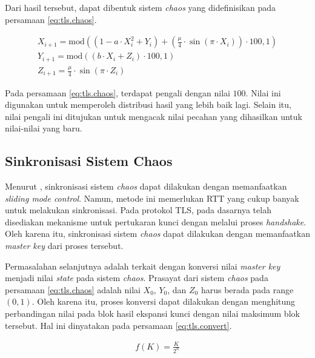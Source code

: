 Dari hasil tersebut, dapat dibentuk sistem \emph{chaos} yang didefinisikan pada persamaan \ref{eq:tls.chaos}.

\begin{equation}
  \begin{aligned}
    X_{i+1} = \text{mod}((1 - a \cdot X_i^2 + Y_i) + (\frac{\mu}{4} \cdot \sin{(\pi \cdot X_{i})}) \cdot 100, 1)  \\
    Y_{i+1} = \text{mod}((b \cdot X_i + Z_{i}) \cdot 100, 1) \\
    Z_{i+1} = \frac{\mu}{4} \cdot \sin{(\pi \cdot Z_{i})}
  \end{aligned}
  \label{eq:tls.chaos}
\end{equation}

Pada persamaan \ref{eq:tls.chaos}, terdapat pengali dengan nilai $100$. Nilai ini digunakan untuk memperoleh distribusi hasil yang lebih baik lagi. Selain itu, nilai pengali ini ditujukan untuk mengacak nilai pecahan yang dihasilkan untuk nilai-nilai yang baru.

\subsection{Sinkronisasi Sistem Chaos}

Menurut \textcite{lin2021}, sinkronisasi sistem \emph{chaos} dapat dilakukan dengan memanfaatkan \emph{sliding mode control}. Namun, metode ini memerlukan RTT yang cukup banyak untuk melakukan sinkronisasi. Pada protokol TLS, pada dasarnya telah disediakan mekanisme untuk pertukaran kunci dengan melalui proses \emph{handshake}. Oleh karena itu, sinkronisasi sistem \emph{chaos} dapat dilakukan dengan memanfaatkan \emph{master key} dari proses tersebut.

Permasalahan selanjutnya adalah terkait dengan konversi nilai \emph{master key} menjadi nilai \emph{state} pada sistem \emph{chaos}. Prasayat dari sistem \emph{chaos} pada persamaan \ref{eq:tls.chaos} adalah nilai $X_0$, $Y_0$, dan $Z_0$ harus berada pada range $(0,1)$. Oleh karena itu, proses konversi dapat dilakukan dengan menghitung perbandingan nilai pada blok hasil ekspansi kunci dengan nilai maksimum blok tersebut. Hal ini dinyatakan pada persamaan \ref{eq:tls.convert}.

\begin{equation}
  \begin{aligned}
    f(K) = \frac{K}{2^{n}} \\
  \end{aligned}
  \label{eq:tls.convert}
\end{equation}

